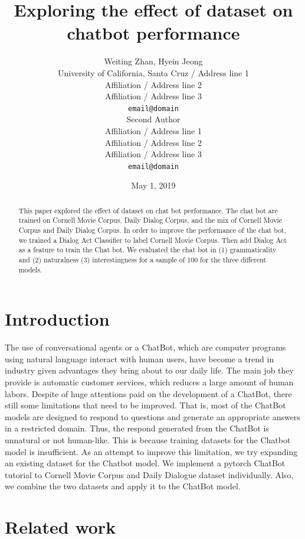 \documentclass[11pt,a4paper]{article}
\title{Exploring the effect of dataset on chatbot performance}
\author {Weiting Zhan, Hyein Jeong \\
  University of California, Santa Cruz / Address line 1 \\
  Affiliation / Address line 2 \\
  Affiliation / Address line 3 \\
  {\tt email@domain} \\\And
  Second Author \\
  Affiliation / Address line 1 \\
  Affiliation / Address line 2 \\
  Affiliation / Address line 3 \\
  {\tt email@domain} \\}
\date{May 1, 2019}
\begin{document}
\maketitle
\begin{abstract}
This paper explored the effect of dataset on chat bot performance. The chat bot are trained on Cornell Movie Corpus, Daily Dialog Corpus, and the mix of Cornell Movie Corpus and Daily Dialog Corpus. In order to improve the performance of the chat bot, we trained a Dialog Act Classifier to label Cornell Movie Corpus. Then add Dialog Act as a feature to train the Chat bot. We evaluated the chat bot in (1) grammaticality and (2) naturalness (3) interestingness for a sample of 100 for the three different models. 
\end{abstract}



\section{Introduction}

The use of conversational agents or a ChatBot, which are computer programs using natural language interact with human users, have become a trend in industry given advantages they bring about to our daily life.  The main job they provide is automatic customer services, which reduces a large amount of human labors. Despite of huge attentions paid on the development of a ChatBot, there still some limitations that need to be improved. That is, most of the ChatBot models are designed to respond to questions and generate an appropriate answers in a restricted domain. Thus, the respond generated from the ChatBot is unnatural or not human-like. This is because training datasets for the Chatbot model is insufficient. As an attempt to improve this limitation, we try expanding an existing dataset for the Chatbot model. We implement a pytorch \cite{paszke2017automatic} ChatBot tutorial to Cornell Movie Corpus \cite{Danescu-Niculescu-Mizil+Lee:11a} and Daily Dialogue dataset\cite{li2017dailydialog} individually. Also, we combine the two datasets and apply it to the ChatBot model. 


 
\section{Related work}
\end{document}
